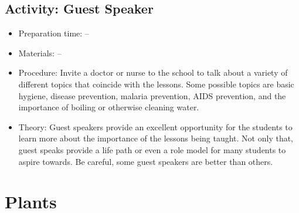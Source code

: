 \subsection{Activity: Guest Speaker}
\begin{itemize}
\item{Preparation time: --}
\item{Materials: --}
\item{Procedure: Invite a doctor or nurse to the school to talk about a variety of different topics that coincide with the lessons. Some possible topics are basic hygiene, disease prevention, malaria prevention, AIDS prevention, and the importance of boiling or otherwise cleaning water.}
\item{Theory: Guest speakers provide an excellent opportunity for the students to learn more about the importance of the lessons being taught. Not only that, guest speaks provide a life path or even a role model for many students to aspire towards. Be careful, some guest speakers are better than others.}
\end{itemize}

\section{Plants}


